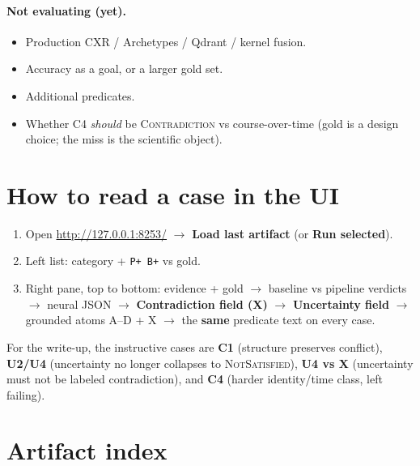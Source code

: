 \documentclass[11pt,a4paper]{article}
\newcommand{\nsat}{\textsc{NotSatisfied}}
\newcommand{\con}{\textsc{Contradiction}}
\begin{document}
\paragraph{Not evaluating (yet).}
\begin{itemize}
  \item Production CXR / Archetypes / Qdrant / kernel fusion.
  \item Accuracy as a goal, or a larger gold set.
  \item Additional predicates.
  \item Whether C4 \emph{should} be \con{} vs course-over-time (gold is a design choice; the miss is the scientific object).
\end{itemize}

\section{How to read a case in the UI}

\begin{enumerate}
  \item Open \url{http://127.0.0.1:8253/} $\rightarrow$ \textbf{Load last artifact} (or \textbf{Run selected}).
  \item Left list: category + \texttt{P+}~\texttt{B+} vs gold.
  \item Right pane, top to bottom: evidence + gold $\rightarrow$ baseline vs pipeline verdicts $\rightarrow$ neural JSON $\rightarrow$ \textbf{Contradiction field (X)} $\rightarrow$ \textbf{Uncertainty field} $\rightarrow$ grounded atoms A--D + X $\rightarrow$ the \textbf{same} predicate text on every case.
\end{enumerate}

For the write-up, the instructive cases are \textbf{C1} (structure preserves conflict), \textbf{U2/U4} (uncertainty no longer collapses to \nsat), \textbf{U4 vs X} (uncertainty must not be labeled contradiction), and \textbf{C4} (harder identity/time class, left failing).

\section{Artifact index}
\end{document}
